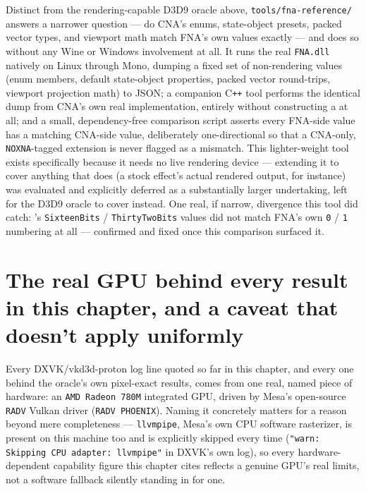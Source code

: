 Distinct from the rendering-capable D3D9 oracle above, \texttt{tools/fna-reference/} answers
a narrower question --- do CNA's enums, state-object presets, packed vector types, and
viewport math match FNA's own values exactly --- and does so without any Wine or Windows
involvement at all. It runs the real \texttt{FNA.dll} natively on Linux through Mono, dumping
a fixed set of non-rendering values (enum members, default state-object properties, packed
vector round-trips, viewport projection math) to JSON; a companion C\texttt{++} tool performs
the identical dump from CNA's own real implementation, entirely without constructing a
 at all; and a small, dependency-free comparison script asserts every
FNA-side value has a matching CNA-side value, deliberately one-directional so that a
CNA-only, \texttt{NOXNA}-tagged extension is never flagged as a mismatch. This lighter-weight
tool exists specifically because it needs no live rendering device --- extending it to cover
anything that does (a stock effect's actual rendered output, for instance) was evaluated and
explicitly deferred as a substantially larger undertaking, left for the D3D9 oracle to cover
instead. One real, if narrow, divergence this tool did catch: 's
\texttt{SixteenBits} / \texttt{ThirtyTwoBits} values did not match FNA's own \texttt{0} / \texttt{1}
numbering at all --- confirmed and fixed once this comparison surfaced it.

\section{The real GPU behind every result in this chapter, and a caveat that doesn't apply
uniformly}

Every DXVK/vkd3d-proton log line quoted so far in this chapter, and every one behind the
oracle's own pixel-exact results, comes from one real, named piece of hardware: an
\texttt{AMD Radeon 780M} integrated GPU, driven by Mesa's open-source \texttt{RADV} Vulkan
driver (\texttt{RADV PHOENIX}). Naming it concretely matters for a reason beyond mere
completeness --- \texttt{llvmpipe}, Mesa's own CPU software rasterizer, is present on this
machine too and is explicitly skipped every time (\texttt{"warn: Skipping CPU adapter:
llvmpipe"} in DXVK's own log), so every hardware-dependent capability figure this chapter
cites reflects a genuine GPU's real limits, not a software fallback silently standing in for
one.

